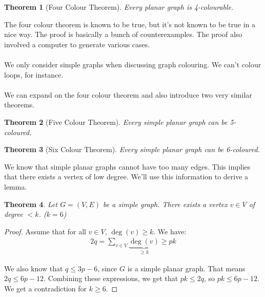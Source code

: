 \documentclass[]{article}
\newtheorem*{theorem}{Theorem}
\theoremstyle{definition}
\newcommand{\lecture}[1]{\marginpar{{\footnotesize $\leftarrow$ \underline{#1}}}}
\begin{document}
			\begin{theorem}[Four Colour Theorem]
				Every planar graph is 4-colourable.
			\end{theorem}

			The four colour theorem is known to be true, but it's not known to be true in a nice way. The proof is basically a bunch of counterexamples. The proof also involved a computer to generate various cases. \lecture{March 22, 2013}
			\\ \\
			We only consider simple graphs when discussing graph colouring. We can't colour loops, for instance.
			\\ \\
			We can expand on the four colour theorem and also introduce two very similar theorems.

			\begin{theorem}[Five Colour Theorem]
				Every simple planar graph can be 5-coloured.
			\end{theorem}

			\begin{theorem}[Six Colour Theorem]
				Every simple planar graph can be 6-coloured.
			\end{theorem}

			We know that simple planar graphs cannot have too many edges. This implies that there exists a vertex of low degree. We'll use this information to derive a lemma.
			\begin{theorem}
				Let $G = (V, E)$ be a simple graph. There exists a vertex $v \in V$ of degree $< k$. ($k = 6$)
			\end{theorem}

			\begin{proof}
				Assume that for all $v \in V$, $\deg(v) \ge k$. We have:
				\begin{align*}
					2q = \sum_{v \in V} \underbrace{\deg(v)}_{\ge k} \ge pk
				\end{align*}

				We also know that $q \le 3p - 6$, since $G$ is a simple planar graph. That means $2q \le 6p - 12$. Combining these expressions, we get that $pk \le 2q$, so $pk \le 6p - 12$. We get a contradiction for $k \ge 6$.
			\end{proof}
\end{document}
